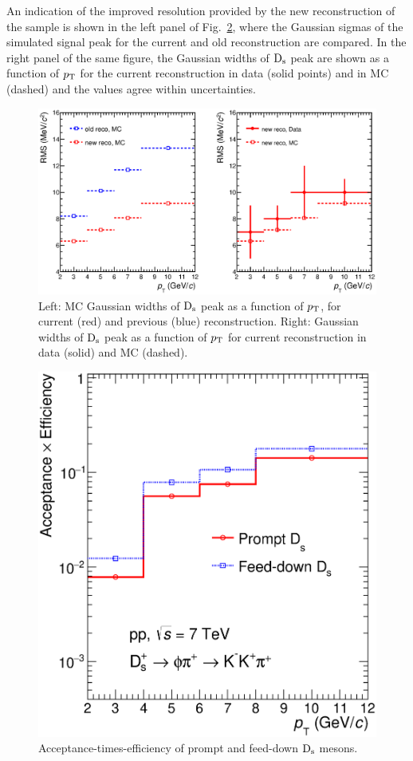 An indication of the improved resolution provided by the new 
reconstruction of the sample is shown in the left panel of Fig.~\ref{fig:sigma4vs2}, where the 
Gaussian sigmas of the simulated signal peak for the current and old
reconstruction are compared. In the right
panel of the same figure, the Gaussian widths of ${\rm D_s}$ peak are shown 
as a function of $p_{\rm T}$ for the current reconstruction in data (solid points)
and in MC (dashed) and the values agree within uncertainties. 
\begin{figure}[!hb]
\begin{center}
\includegraphics[width=.9\textwidth]{FigCap4/Resolutions_pass2_pass4.eps}
\caption{Left: MC Gaussian widths of ${\rm D_s}$ peak as a function of $p_{\rm T}$, for current (red) and previous (blue) reconstruction. Right: Gaussian widths of ${\rm D_s}$ peak as a function of $p_{\rm T}$ for current reconstruction in data (solid) and MC (dashed). }
\label{fig:sigma4vs2}
\end{center}
\end{figure}

\begin{figure}[!hb]
\begin{center}
\includegraphics[width=.52\textwidth]{FigCap4/AccEff_Ds_Pass4.eps}
\caption{Acceptance-times-efficiency of prompt and feed-down ${\rm D_s}$ mesons.}
\label{fig:sigma4vs2}
\end{center}
\end{figure}

